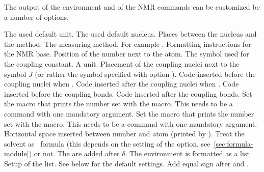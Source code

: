 \documentclass{chemmacros-manual}
\begin{document}
The output of the environment and of the NMR commands can be customized be a
number of options.  
\begin{options}
    The used default unit.
    The used default nucleus.
  \Initial{-}
    Places  between the nucleus and the method.
    The measuring method.
  \Initial
    For example .
  \Initial
    Formatting instructions for the NMR base.
    Position of the number next to the atom.
    The symbol used for the coupling constant.
    A  unit.
    Placement of the coupling nuclei next to the symbol $J$ (or rather the
    symbol specified with option ).
  \Initial{(}
    Code inserted before the coupling nuclei when .
  \Initial{)}
    Code inserted after the coupling nuclei when .
  \Initial
    Code inserted before the coupling bonds.
  \Initial{\cs*{!}}
    Code inserted after the coupling bonds.
    Set the macro that prints the number set with the  macro.  This
    needs to be a command with one mandatory argument.
    Set the macro that prints the number set with the \cs{\#} macro.  This
    needs to be a command with one mandatory argument.
  \Initial{.16667em}
    Horizontal space inserted between number and atom
    (printed by \cs{\#}).
    Treat the solvent as \chemformula\ formula (this depends on the setting of
    the  option, see~\vref{sec:formula-module}) or not.
  \Initial
    The  are added after $\delta$.
    The environment  is formatted as a list
    Setup of the list. See below for the default settings.
    Add equal sign after  and .
\end{options}
\end{document}
